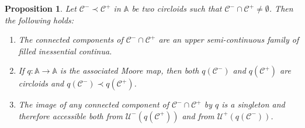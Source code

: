\documentclass[12pt,a4paper]{amsart}
\newtheorem{prop}[thm]{Proposition}
\theoremstyle{definition}
\theoremstyle{remark}
\newcommand{\A}{\mathbb{A}}
\begin{document}
\begin{prop}\label{p.intercircacc}
Let $\mathcal{C}^- \prec \mathcal{C}^+$ in $\A$ be two circloids such that 
$\mathcal{C}^- \cap \mathcal{C}^+ \neq \emptyset$. Then the following holds:

\begin{enumerate} 
\item The connected components of $\mathcal{C}^- \cap \mathcal{C}^+$ are an upper semi-continuous family of filled inessential continua.

\item If $q:\A\to\A$ is the associated Moore map, then both $q(\mathcal{C}^-)$ and $q(\mathcal{C}^+)$ are circloids and $q(\mathcal{C}^-)\prec q(\mathcal{C}^+)$.

\item The image of any connected component of $\mathcal{C}^- \cap \mathcal{C}^+$ by $q$ is a singleton and therefore accessible both from $\mathcal{U}^{-}(q(\mathcal{C}^+))$ and from $\mathcal{U}^{+}(q(\mathcal{C}^-))$.
\end{enumerate}
\end{prop}
\end{document}
